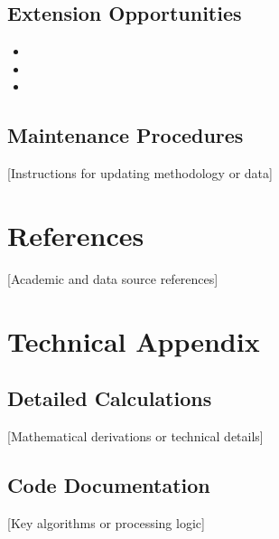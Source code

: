 \documentclass[11pt,letterpaper]{article}
\begin{document}
\subsection{Extension Opportunities}
\begin{itemize}
    \item [Enhancement 1]
    \item [Enhancement 2]
    \item [Enhancement 3]
\end{itemize}

\subsection{Maintenance Procedures}
[Instructions for updating methodology or data]

\section{References}

[Academic and data source references]

\section{Technical Appendix}

\subsection{Detailed Calculations}
[Mathematical derivations or technical details]

\subsection{Code Documentation}
[Key algorithms or processing logic]
\end{document}
